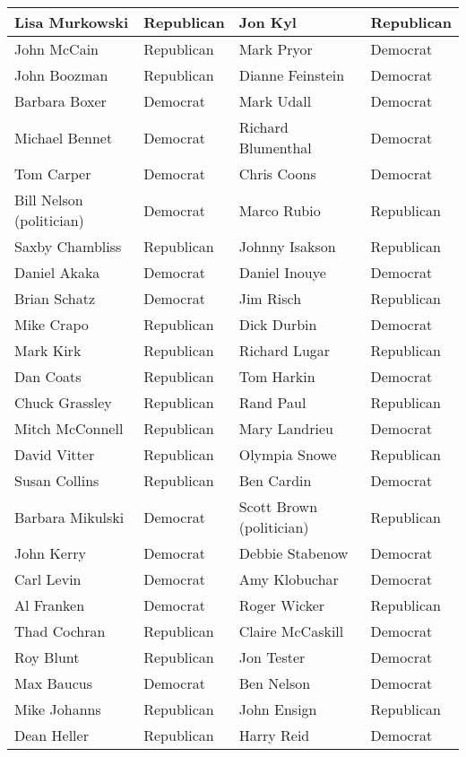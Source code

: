 \documentclass[10pt,11pt,12pt,oneside]{book}
\begin{document}
\begin{appendices}
\begin{table}[H]
\begin{tabular}{|p{2in}|p{0.5in}||p{2in}|p{0.5in}|}
		Lisa Murkowski & Republican & Jon Kyl & Republican\\ \hline
		John McCain & Republican & Mark Pryor & Democrat\\ \hline
		John Boozman & Republican & Dianne Feinstein & Democrat\\ \hline
		Barbara Boxer & Democrat & Mark Udall & Democrat\\ \hline
		Michael Bennet & Democrat & Richard Blumenthal & Democrat\\ \hline
		Tom Carper & Democrat & Chris Coons & Democrat\\ \hline
		Bill Nelson (politician) & Democrat & Marco Rubio & Republican\\ \hline
		Saxby Chambliss & Republican & Johnny Isakson & Republican\\ \hline
		Daniel Akaka & Democrat & Daniel Inouye & Democrat\\ \hline
		Brian Schatz & Democrat & Jim Risch & Republican\\ \hline
		Mike Crapo & Republican & Dick Durbin & Democrat\\ \hline
		Mark Kirk & Republican & Richard Lugar & Republican\\ \hline
		Dan Coats & Republican & Tom Harkin & Democrat\\ \hline
		Chuck Grassley & Republican & Rand Paul & Republican\\ \hline
		Mitch McConnell & Republican & Mary Landrieu & Democrat\\ \hline
		David Vitter & Republican & Olympia Snowe & Republican\\ \hline
		Susan Collins & Republican & Ben Cardin & Democrat\\ \hline
		Barbara Mikulski & Democrat & Scott Brown (politician) & Republican\\ \hline
		John Kerry & Democrat & Debbie Stabenow & Democrat\\ \hline
		Carl Levin & Democrat & Amy Klobuchar & Democrat\\ \hline
		Al Franken & Democrat & Roger Wicker & Republican\\ \hline
		Thad Cochran & Republican & Claire McCaskill & Democrat\\ \hline
		Roy Blunt & Republican & Jon Tester & Democrat\\ \hline
		Max Baucus & Democrat & Ben Nelson & Democrat\\ \hline
		Mike Johanns & Republican & John Ensign & Republican\\ \hline
		Dean Heller & Republican & Harry Reid & Democrat\\ \hline

\end{tabular}
\end{table}
\end{appendices}
\end{document}
